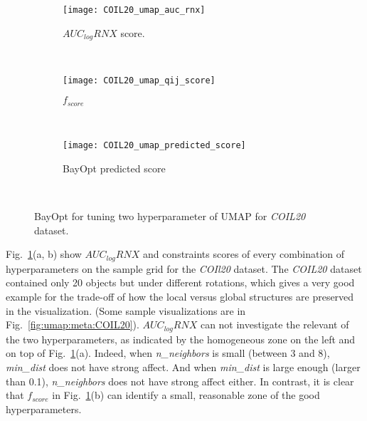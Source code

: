 \begin{figure}[]%
    \begin{subfigure}[b]{.78\linewidth}
        \texttt{[image: COIL20\_umap\_auc\_rnx]}
        \caption{$AUC_{log}RNX$ score.}
    \end{subfigure}
    ~
    \begin{subfigure}[b]{.78\linewidth}
        \texttt{[image: COIL20\_umap\_qij\_score]}
        \caption{$f_{score}$}
    \end{subfigure}
    ~
    \begin{subfigure}[b]{\linewidth}
        \centering
        \texttt{[image: COIL20\_umap\_predicted\_score]}
        \caption{BayOpt predicted score}
    \end{subfigure}
    ~
    \caption{BayOpt for tuning two hyperparameter of UMAP for \emph{COIL20} dataset.}
    \label{fig:bo:umap:COIL20}
\end{figure}

Fig.~\ref{fig:bo:umap:COIL20}(a, b) show $AUC_{log}RNX$ and constraints scores of every combination of hyperparameters on the sample grid for the \emph{COIl20} dataset.
The \emph{COIL20} dataset contained only 20 objects but under different rotations, which gives a very good example for the trade-off of how the local versus global structures are preserved in the visualization. (Some sample visualizations are in Fig.~\ref{fig:umap:meta:COIL20}).
$AUC_{log}RNX$ can not investigate the relevant of the two hyperparameters, as indicated by the homogeneous zone on the left and on top of Fig.~\ref{fig:bo:umap:COIL20}(a).
Indeed, when \emph{n\_neighbors} is small (between 3 and 8), \emph{min\_dist} does not have strong affect. And when \emph{min\_dist} is large enough (larger than 0.1), \emph{n\_neighbors} does not have strong affect either.
In contrast, it is clear that $f_{score}$ in Fig.~\ref{fig:bo:umap:COIL20}(b) can identify a small, reasonable zone of the good hyperparameters.

\begin{figure*}
    \centering
    \begin{subfigure}[b]{.8\linewidth}
        \centering
        \texttt{[image: \{COIL20\_umap\_metamap]}.png}
    \end{subfigure}
    ~
    \begin{subfigure}[b]{.8\linewidth}
        \texttt{[image: COIL20\_umap\_show]}
    \end{subfigure}
    \caption{Metamaps and sample visualizations with selected hyperparameters for the \emph{COIL20} dataset.}
    \label{fig:umap:meta:COIL20}
\end{figure*}

